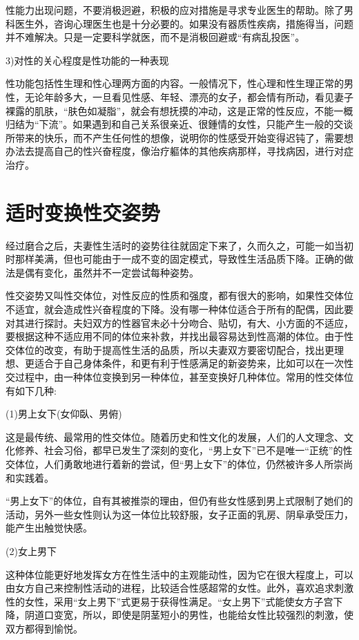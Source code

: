 \documentclass[12pt,UTF8]{ctexbook}
\begin{document}
性能力出现问题，不要消极迥避，积极的应对措施是寻求专业医生的帮助。除了男科医生外，咨询心理医生也是十分必要的。如果没有器质性疾病，措施得当，问题并不难解决。只是一定要科学就医，而不是消极回避或“有病乱投医”。

3)对性的关心程度是性功能的一种表现

性功能包括性生理和性心理两方面的内容。一般情况下，性心理和性生理正常的男性，无论年龄多大，一旦看见性感、年轻、漂亮的女子，都会情有所动，看见妻子裸露的肌肤，“肤色如凝脂”，就会有想抚摸的冲动，这是正常的性反应，不能一概归结为“下流”。如果遇到和自己关系很亲近、很鍾情的女性，只能产生一般的交谈所带来的快乐，而不产生任何性的想像，说明你的性感受开始变得迟钝了，需要想办法去提高自己的性兴奋程度，像治疗軀体的其他疾病那样，寻找病因，进行对症治疗。

\section{适时变换性交姿势}

经过磨合之后，夫妻性生活时的姿势往往就固定下来了，久而久之，可能一如当初时那样美满，但也可能由于一成不变的固定模式，导致性生活品质下降。正确的做法是偶有变化，虽然并不一定尝试每种姿势。

性交姿势又叫性交体位，对性反应的性质和强度，都有很大的影响，如果性交体位不适宜，就会造成性兴奋程度的下降。没有哪一种体位适合于所有的配偶，因此要对其进行探討。夫妇双方的性器官未必十分吻合、贴切，有大、小方面的不适应，要根据这种不适应用不同的体位来补救，并找出最容易达到性高潮的体位。由于性交体位的改变，有助于提高性生活的品质，所以夫妻双方要密切配合，找出更理想、更适合于自己身体条件，和更有利于性感满足的新姿势来，比如可以在一次性交过程中，由一种体位变换到另一种体位，甚至变换好几种体位。常用的性交体位有如下几种:

(1)男上女下(女仰臥、男俯)

这是最传统、最常用的性交体位。随着历史和性文化的发展，人们的人文理念、文化修养、社会习俗，都早已发生了深刻的变化，“男上女下”已不是唯一“正统”的性交体位，人们勇敢地进行着新的尝试，但“男上女下”的体位，仍然被许多人所崇尚和实践着。

“男上女下”的体位，自有其被推崇的理由，但仍有些女性感到男上式限制了她们的活动，另外一些女性则认为这一体位比较舒服，女子正面的乳房、阴阜承受压力，能产生出触觉快感。

(2)女上男下

这种体位能更好地发挥女方在性生活中的主观能动性，因为它在很大程度上，可以由女方自己来控制性活动的进程，比较适合性感超常的女性。此外，喜欢追求刺激性的女性，采用“女上男下”式更易于获得性满足。“女上男下”式能使女方子宫下降，阴道口变宽，所以，即使是阴茎短小的男性，也能给女性比较强烈的刺激，使双方都得到愉悦。
\end{document}
